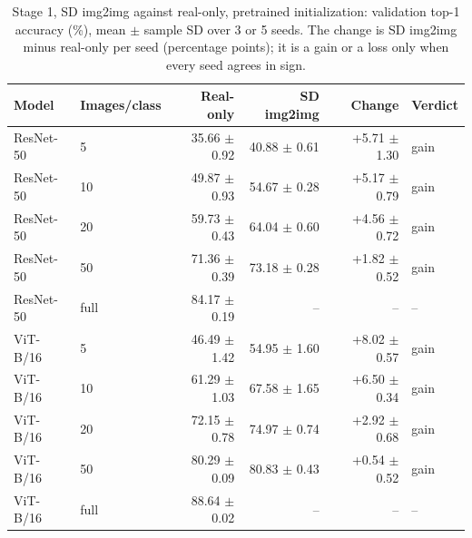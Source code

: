 \begin{table}[H]
\centering
\caption{Stage 1, SD img2img against real-only, pretrained initialization: validation top-1 accuracy (\%), mean $\pm$ sample SD over 3 or 5 seeds. The change is SD img2img minus real-only per seed (percentage points); it is a gain or a loss only when every seed agrees in sign.}
\label{tab:stage1-pretrained-accuracy-sd_img2img}
\begin{tabular}{llrrrl}
\toprule
Model & Images/class & Real-only & SD img2img & Change & Verdict \\
\midrule
ResNet-50 & 5 & 35.66 $\pm$ 0.92 & 40.88 $\pm$ 0.61 & +5.71 $\pm$ 1.30 & gain \\
ResNet-50 & 10 & 49.87 $\pm$ 0.93 & 54.67 $\pm$ 0.28 & +5.17 $\pm$ 0.79 & gain \\
ResNet-50 & 20 & 59.73 $\pm$ 0.43 & 64.04 $\pm$ 0.60 & +4.56 $\pm$ 0.72 & gain \\
ResNet-50 & 50 & 71.36 $\pm$ 0.39 & 73.18 $\pm$ 0.28 & +1.82 $\pm$ 0.52 & gain \\
ResNet-50 & full & 84.17 $\pm$ 0.19 & -- & -- & -- \\
\midrule
ViT-B/16 & 5 & 46.49 $\pm$ 1.42 & 54.95 $\pm$ 1.60 & +8.02 $\pm$ 0.57 & gain \\
ViT-B/16 & 10 & 61.29 $\pm$ 1.03 & 67.58 $\pm$ 1.65 & +6.50 $\pm$ 0.34 & gain \\
ViT-B/16 & 20 & 72.15 $\pm$ 0.78 & 74.97 $\pm$ 0.74 & +2.92 $\pm$ 0.68 & gain \\
ViT-B/16 & 50 & 80.29 $\pm$ 0.09 & 80.83 $\pm$ 0.43 & +0.54 $\pm$ 0.52 & gain \\
ViT-B/16 & full & 88.64 $\pm$ 0.02 & -- & -- & -- \\
\bottomrule
\end{tabular}
\end{table}
